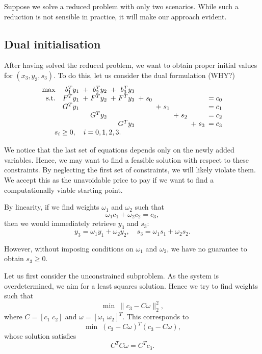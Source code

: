 Suppose we solve a reduced problem with only two scenarios. 
While such a reduction is not sensible in practice, it will 
make our approach evident.

%
%
\subsection{Dual initialisation}

After having solved the reduced problem, we want to obtain 
proper initial values for $(x_3, y_3, s_3)$. To do this, let 
us consider the dual formulation (WHY?)
\[
\begin{array}{rrrrllllll}
\max & b_1^T y_1 & \!\!\! + \;\,\, b_2^T y_2 & \!\!\! + \;\,\, b_3^T y_3 \\
\mbox{s.t.} & F^T y_1 & \!\!\! + \; F^Ty_2 & \!\!\! +\; F^Ty_3 & \!\!\! +\; s_0 &&&& \!\!\!= c_0 \\
            & G^T y_1 &&&& \!\!\! + \; s_1 &&&  \!\!\!= c_1 \\
            && G^T y_2 &&&&  \!\!\! + \; s_2 && \!\!\!= c_2 \\
            &&& G^T y_3 &&&& \!\!\! + \; s_3 &  \!\!\!= c_3 \\
            &&&&&&&& \hspace{-7.8cm} s_i \ge 0, \quad i = 0, 1, 2, 3.
\end{array}
\]

We notice that the last set of equations depends only on the 
newly added variables. Hence, we may want to find a feasible 
solution with respect to these constraints. By neglecting the 
first set of constraints, we will likely violate them. We accept 
this as the unavoidable price to pay if we want to find a 
computationally viable starting point.

By linearity, if we find weights $\omega_1$ and $\omega_2$ such that
\[
  \omega_1 c_1 + \omega_2 c_2 = c_3,
\]
then we would immediately retrieve $y_3$ and $s_3$:
\[
  y_3 = \omega_1 y_1 + \omega_2 y_2, \quad s_3 = \omega_1 s_1 + \omega_2 s_2.
\]

However, without imposing conditions on $\omega_1$ and $\omega_2$, 
we have no guarantee to obtain $s_3 \ge 0$.

Let us first consider the unconstrained subproblem. As the system 
is overdetermined, we aim for a least squares solution. Hence we 
try to find weights such that
\[
  \min \; \| c_3 - C\omega\|_2^2,
\]
where $C = [c_1 \; c_2]$ and $\omega = [\omega_1 \; \omega_2]^T$. 
This corresponds to
\[
  \min \; (c_3 - C\omega)^T(c_3 - C\omega),
\]
whose solution satisfies
\[
  C^T C\omega = C^T c_3.
\]

